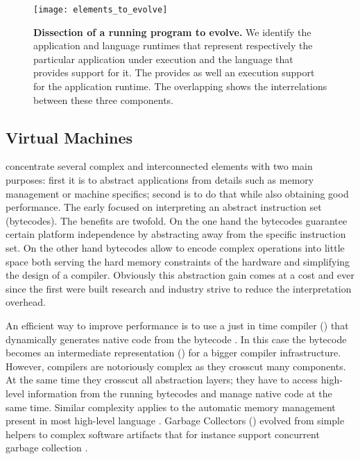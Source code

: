 \begin{figure}[!ht]
\begin{center}
\texttt{[image: elements\_to\_evolve]}
\caption{\textbf{Dissection of a running program to evolve.}\label{fig:whatToEvolve} We identify the application and language runtimes that represent respectively the particular application under execution and the language that provides support for it. The \VM provides as well an execution support for the application runtime. The overlapping shows the interrelations between these three components.}
\end{center}
\end{figure}



\subsection{Virtual Machines}

\VMs concentrate several complex and interconnected elements with two main purposes: first it is to abstract applications from details such as memory management or machine specifics; second is to do that while also obtaining good performance.
The early \VMs focused on interpreting an abstract instruction set (bytecodes).
The benefits are twofold.
On the one hand the bytecodes guarantee certain platform independence by abstracting away from the \CPU specific instruction set.
On the other hand bytecodes allow to encode complex operations into little space both serving the hard memory constraints of the hardware and simplifying the design of a compiler.
Obviously this abstraction gain comes at a cost and ever since the first \VMs were built research and industry strive to reduce the interpretation overhead.

An efficient way to improve performance is to use a just in time compiler (\JIT) that dynamically generates native code from the bytecode \cite{Deut84a}.
In this case the bytecode becomes an intermediate representation (\IR) for a bigger compiler infrastructure.
However, \JIT compilers are notoriously complex as they crosscut many \VM components.
At the same time they crosscut all abstraction layers; they have to access high-level information from the running bytecodes and manage native code at the same time.
Similar complexity applies to the automatic memory management present in most high-level language \VMs.
Garbage Collectors (\GC) evolved from simple helpers to complex software artifacts that for instance support concurrent garbage collection \cite{Clic05a}.

